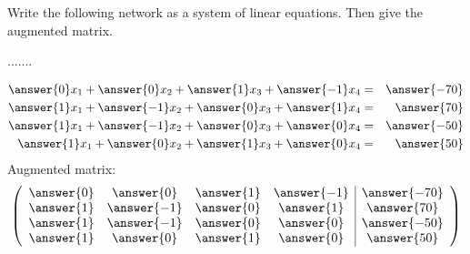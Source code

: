 \documentclass{ximera}
\author{Parisa Fatheddin}
\begin{document}
\begin{exercise}
  Write the following network as a system of linear equations. Then give the augmented matrix.

  .......\\

  \begin{prompt}
    \begin{eqnarray*}
      \answer{0} x_{1} + \answer{0} x_{2} +\answer{1}x_{3} + \answer{-1}x_{4} &=& \answer{-70}\\
      \answer{1} x_{1} + \answer{-1} x_{2} +\answer{0}x_{3} + \answer{1}x_{4} &=& \answer{70}\\
      \answer{1} x_{1} + \answer{-1} x_{2} +\answer{0}x_{3} + \answer{0}x_{4} &=& \answer{-50}\\
      \answer{1} x_{1} + \answer{0} x_{2} +\answer{1}x_{3} + \answer{0}x_{4} &=& \answer{50}
    \end{eqnarray*}
    Augmented matrix:
    \[
      \left(
        \begin{array}{cccc|c}
          \answer{0} & \answer{0} & \answer{1} & \answer{-1}& \answer{-70}\\
          \answer{1} & \answer{-1} & \answer{0} & \answer{1}& \answer{70}\\
          \answer{1} & \answer{-1} & \answer{0} & \answer{0}& \answer{-50}\\
          \answer{1} & \answer{0} & \answer{1} & \answer{0}& \answer{50}
        \end{array}
      \right)
    \]
  \end{prompt}

\end{exercise}
\end{document}
